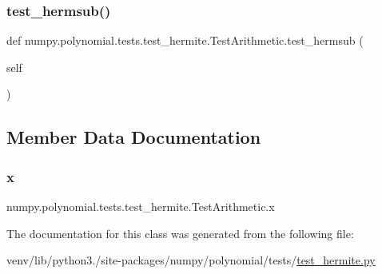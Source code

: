 \subsubsection{\texorpdfstring{test\+\_\+hermsub()}{test\_hermsub()}}
{\footnotesize\ttfamily def numpy.\+polynomial.\+tests.\+test\+\_\+hermite.\+Test\+Arithmetic.\+test\+\_\+hermsub (\begin{DoxyParamCaption}\item[{}]{self }\end{DoxyParamCaption})}



\subsection{Member Data Documentation}
\mbox{\label{classnumpy_1_1polynomial_1_1tests_1_1test__hermite_1_1TestArithmetic_ae952dc28d8b7d96d41b9f59badb40382}} 
\subsubsection{\texorpdfstring{x}{x}}
{\footnotesize\ttfamily numpy.\+polynomial.\+tests.\+test\+\_\+hermite.\+Test\+Arithmetic.\+x\hspace{0.3cm}{\ttfamily [static]}}



The documentation for this class was generated from the following file\+:\begin{DoxyCompactItemize}
\item 
venv/lib/python3./site-\/packages/numpy/polynomial/tests/\hyperlink{test__hermite_8py}{test\+\_\+hermite.\+py}\end{DoxyCompactItemize}
